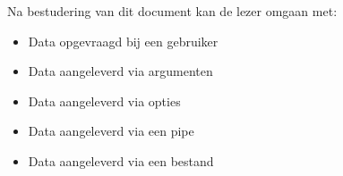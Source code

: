 Na bestudering van dit document kan de lezer omgaan met:
\begin{itemize}
\item Data opgevraagd bij een gebruiker
\item Data aangeleverd via argumenten
\item Data aangeleverd via opties
\item Data aangeleverd via een pipe
\item Data aangeleverd via een bestand
\end{itemize}
